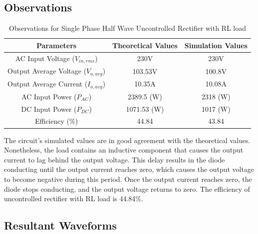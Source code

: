 \subsection{Observations}

\begin{table}[h]
    \renewcommand{\arraystretch}{1.3}
    \label{table_observation_2}
    \centering
    \begin{tabular}{|c|c|c|}
        \hline
        Parameters                              & Theoretical Values & Simulation Values \\
        \hline
        \hline
        AC Input Voltage ($ V_{in,rms} $)       & 230V               & 230V              \\
        \hline
        Output Average Voltage ($ V_{o,avg} $)  & 103.53V            & 100.8V            \\
        \hline
        Output Average Current ($ I_{o,avg}  $) & 10.35A             & 10.08A            \\
        \hline
        AC Input Power ($ P_{AC} $)             & 2389.5 (W)         & 2318 (W)          \\
        \hline
        DC Input Power ($ P_{DC} $)             & 1071.53 (W)        & 1017 (W)          \\
        \hline
        Efficiency (\%)                         & 44.84              & 43.84             \\
        \hline
    \end{tabular}
    \caption{Observations for Single Phase Half Wave Uncontrolled Rectifier with RL load}

\end{table}


The circuit's simulated values are in good agreement with the theoretical values. Nonetheless, the load contains an inductive component that causes the output current to lag behind the output voltage. This delay results in the diode conducting until the output current reaches zero, which causes the output voltage to become negative during this period. Once the output current reaches zero, the diode stops conducting, and the output voltage returns to zero.
The efficiency of uncontrolled rectifier with RL load is 44.84\%.
\pagebreak


\subsection{Resultant Waveforms}

